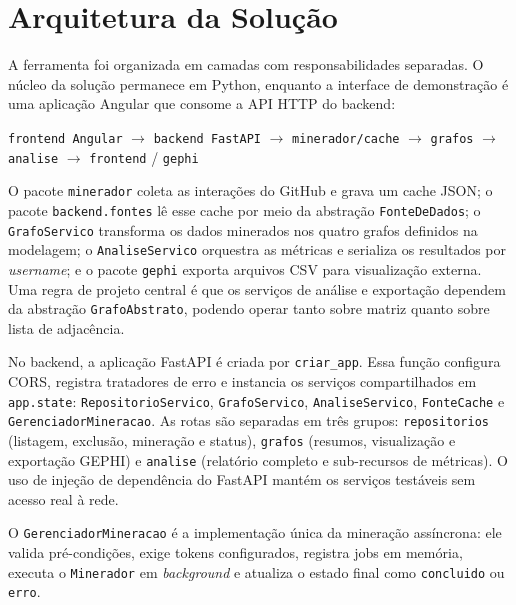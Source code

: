\documentclass[12pt]{article}
\begin{document}
\section{Arquitetura da Solução}
\label{sec:arquitetura}

A ferramenta foi organizada em camadas com responsabilidades separadas. O núcleo
da solução permanece em Python, enquanto a interface de demonstração é uma
aplicação Angular que consome a API HTTP do backend:

\begin{center}
\texttt{frontend Angular} $\rightarrow$ \texttt{backend FastAPI} $\rightarrow$
\texttt{minerador/cache} $\rightarrow$ \texttt{grafos} $\rightarrow$
\texttt{analise} $\rightarrow$ \texttt{frontend} / \texttt{gephi}
\end{center}

O pacote \texttt{minerador} coleta as interações do GitHub e grava um cache JSON;
o pacote \texttt{backend.fontes} lê esse cache por meio da abstração
\texttt{FonteDeDados}; o \texttt{GrafoServico} transforma os dados minerados nos
quatro grafos definidos na modelagem; o \texttt{AnaliseServico} orquestra as
métricas e serializa os resultados por \emph{username}; e o pacote
\texttt{gephi} exporta arquivos CSV para visualização externa. Uma regra de
projeto central é que os serviços de análise e exportação dependem da abstração
\texttt{GrafoAbstrato}, podendo operar tanto sobre matriz quanto sobre lista de
adjacência.

No backend, a aplicação FastAPI é criada por \texttt{criar\_app}. Essa função
configura CORS, registra tratadores de erro e instancia os serviços compartilhados
em \texttt{app.state}: \texttt{RepositorioServico}, \texttt{GrafoServico},
\texttt{AnaliseServico}, \texttt{FonteCache} e \texttt{GerenciadorMineracao}. As
rotas são separadas em três grupos: \texttt{repositorios} (listagem, exclusão,
mineração e status), \texttt{grafos} (resumos, visualização e exportação GEPHI) e
\texttt{analise} (relatório completo e sub-recursos de métricas). O uso de
injeção de dependência do FastAPI mantém os serviços testáveis sem acesso real à
rede.

O \texttt{GerenciadorMineracao} é a implementação única da mineração assíncrona:
ele valida pré-condições, exige tokens configurados, registra jobs em memória,
executa o \texttt{Minerador} em \emph{background} e atualiza o estado final como
\texttt{concluido} ou \texttt{erro}.
\end{document}
